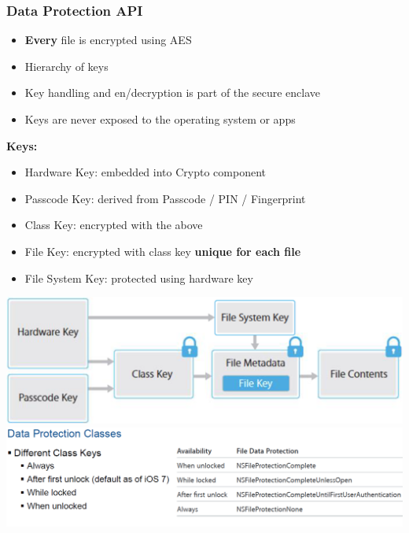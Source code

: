 \subsubsection{Data Protection API}
\begin{itemize}
    \item \textbf{Every} file is encrypted using AES
    \item Hierarchy of keys
    \item Key handling and en/decryption is part of the secure enclave
    \item Keys are never exposed to the operating system or apps
\end{itemize}
\textbf{Keys:}
\begin{itemize}
    \item Hardware Key: embedded into Crypto component
    \item Passcode Key: derived from Passcode / PIN / Fingerprint
    \item Class Key: encrypted with the above
    \item File Key: encrypted with class key \textbf{unique for each file}
    \item File System Key: protected using hardware key
\end{itemize}
\includegraphics[width=\linewidth]{../img/data_protection_api.png}
\includegraphics[width=\linewidth]{../img/data_protection_classes.png}

